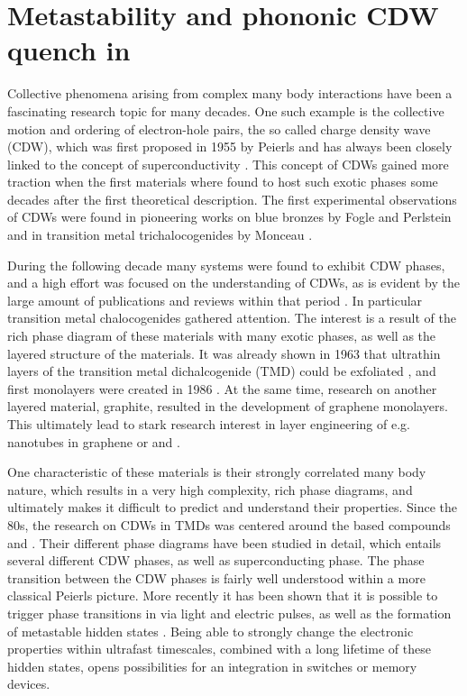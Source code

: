 \chapter{Metastability and phononic CDW quench in }
\label{ch:tate2}

Collective phenomena arising from complex many body interactions have been a fascinating research topic for many decades.
One such example is the collective motion and ordering of electron-hole pairs, the so called charge density wave (CDW), which was first proposed in 1955 by Peierls \cite{peierls_quantum_1996} and has always been closely linked to the concept of superconductivity \cite{frohlich_theory_1997}.
This concept of CDWs gained more traction when the first materials where found to host such exotic phases some decades after the first theoretical description.
The first experimental observations of CDWs were found in pioneering works on blue bronzes by Fogle and Perlstein \cite{fogle_semiconductor--metal_1972} and in transition metal trichalocogenides by Monceau \cite{monceau_electric_1976}.

During the following decade many systems were found to exhibit CDW phases, and a high effort was focused on the understanding of CDWs, as is evident by the large amount of publications and reviews within that period \cite{wilson_questions_1978,gruner_dynamics_1988,yoffe_electronic_1990,wilson_charge-density_2001}.
In particular transition metal chalocogenides gathered attention.
The interest is a result of the rich phase diagram of these materials with many exotic phases, as well as the layered structure of the materials.
It was already shown in 1963 that ultrathin layers of the transition metal dichalcogenide (TMD)  could be exfoliated \cite{frindt_physical_1997}, and first monolayers were created in 1986 \cite{joensen_single-layer_1986}.
At the same time, research on another layered material, graphite, resulted in the development of graphene monolayers.
This ultimately lead to stark research interest in layer engineering of e.g. nanotubes in graphene or  and  \cite{iijima_helical_1991,tenne_polyhedral_1992,feldman_high-rate_1995}.

One characteristic of these materials is their strongly correlated many body nature, which results in a very high complexity, rich phase diagrams, and ultimately makes it difficult to predict and understand their properties.
Since the 80s, the research on CDWs in TMDs was centered around the  based compounds  and .
Their different phase diagrams have been studied in detail, which entails several different CDW phases, as well as superconducting phase.
The phase transition between the CDW phases is fairly well understood within a more classical Peierls picture.
More recently it has been shown that it is possible to trigger phase transitions in  via light and electric pulses, as well as the formation of metastable hidden states \cite{vaskivskyi_controlling_2015,maklar_coherent_2023}.
Being able to strongly change the electronic properties within ultrafast timescales, combined with a long lifetime of these hidden states, opens possibilities for an integration in switches or memory devices.

